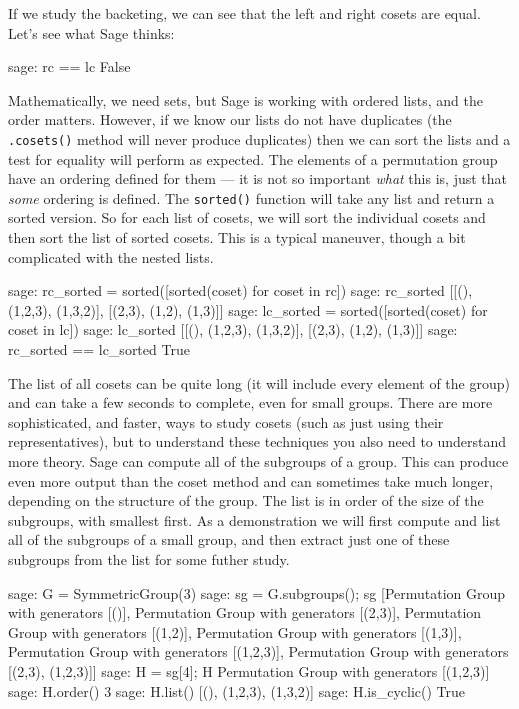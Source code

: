 %
If we study the backeting, we can see that the left and right cosets are equal.  Let's see what Sage thinks:
%
\begin{sageexample}
sage: rc == lc
False
\end{sageexample}
%
Mathematically, we need sets, but Sage is working with ordered lists, and the order matters.  However, if we know our lists do not have duplicates (the \verb?.cosets()? method will never produce duplicates) then we can sort the lists and a test for equality will perform as expected.  The elements of a permutation group have an ordering defined for them --- it is not so important \emph{what} this is, just that \emph{some} ordering is defined.  The \verb?sorted()? function will take any list and return a sorted version.  So for each list of cosets, we will sort the individual cosets and then sort the list of sorted cosets.  This is a typical maneuver, though a bit complicated with the nested lists.
%
\begin{sageexample}
sage: rc_sorted = sorted([sorted(coset) for coset in rc])
sage: rc_sorted
[[(), (1,2,3), (1,3,2)], [(2,3), (1,2), (1,3)]]
sage: lc_sorted = sorted([sorted(coset) for coset in lc])
sage: lc_sorted
[[(), (1,2,3), (1,3,2)], [(2,3), (1,2), (1,3)]]
sage: rc_sorted == lc_sorted
True
\end{sageexample}
%
The list of all cosets can be quite long (it will include every element of the group) and can take a few seconds to complete, even for small groups.  There are more sophisticated, and faster, ways to study cosets (such as just using their representatives), but to understand these techniques you also need to understand more theory.
%
%
Sage can compute all of the subgroups of a group.  This can produce even more output than the coset method and can sometimes take much longer, depending on the structure of the group.  The list is in order of the size of the subgroups, with smallest first.  As a demonstration we will first compute and list all of the subgroups of a small group, and then extract just one of these subgroups from the list for some futher study.
%
\begin{sageexample}
sage: G = SymmetricGroup(3)
sage: sg = G.subgroups(); sg
[Permutation Group with generators [()],
 Permutation Group with generators [(2,3)],
 Permutation Group with generators [(1,2)],
 Permutation Group with generators [(1,3)],
 Permutation Group with generators [(1,2,3)],
 Permutation Group with generators [(2,3), (1,2,3)]]
sage: H = sg[4]; H
Permutation Group with generators [(1,2,3)]
sage: H.order()
3
sage: H.list()
[(), (1,2,3), (1,3,2)]
sage: H.is_cyclic()
True
\end{sageexample}
